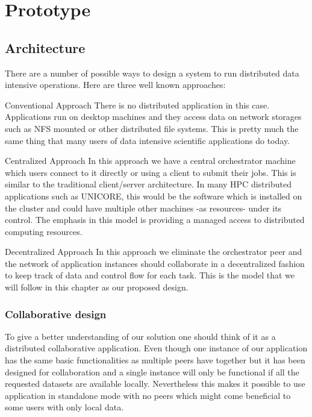 \chapter{Prototype}
\label{cha:prototype}

\section{Architecture}
There are a number of possible ways to design a system to run distributed data intensive operations. Here are 
three well known approaches:
\begin{description}
\item{Conventional Approach} There is no distributed application in this case. Applications run on desktop machines
and they access data on network storages such as NFS mounted or other distributed file systems. This is pretty much
the same thing that many users of data intensive scientific applications do today.

\item{Centralized Approach} In this approach we have a central orchestrator machine which users connect to it directly or
using a client to submit their jobs. This is similar to the traditional client/server architecture. In 
many HPC distributed applications such as UNICORE, this would be the software which is installed on the cluster
and could have multiple other machines -as resources- under its control. The emphasis in this model is providing
a managed access to distributed computing resources.

\item{Decentralized Approach} In this approach we eliminate the orchestrator peer and the network of
application instances should collaborate in a decentralized fashion to keep track of data and control flow for each
task. This is the model that we will follow in this chapter as our proposed design. 
\end{description}

\subsection{Collaborative design}
To give a better understanding of our solution one should think of it as a distributed collaborative application. 
Even though one instance of our application has the same basic functionalities as multiple peers have together
but it has been designed for collaboration and a single instance will only be functional if all the requested datasets are
available locally. Nevertheless this makes it possible to use application in standalone mode with no peers which might
come beneficial to some users with only local data.

